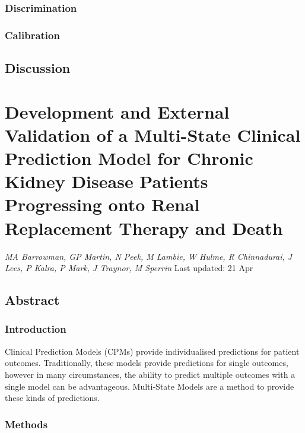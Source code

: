 \documentclass[12pt,PhD,twoside,openright]{muthesis}
\begin{document}
\hypertarget{discrimination}{%
\subsection{Discrimination}\label{discrimination}}

\hypertarget{calibration}{%
\subsection{Calibration}\label{calibration}}

\hypertarget{discussion-3}{%
\section{Discussion}\label{discussion-3}}

\hypertarget{chap-dev-paper}{%
\chapter{Development and External Validation of a Multi-State Clinical Prediction Model for Chronic Kidney Disease Patients Progressing onto Renal Replacement Therapy and Death}\label{chap-dev-paper}}

\emph{MA Barrowman, GP Martin, N Peek, M Lambie, W Hulme, R Chinnadurai, J Lees, P Kalra, P Mark, J Traynor, M Sperrin}
Last updated: 21 Apr

\hypertarget{abstract-2}{%
\section*{Abstract}\label{abstract-2}}

\hypertarget{introduction-6}{%
\subsection*{Introduction}\label{introduction-6}}

Clinical Prediction Models (CPMs) provide individualised predictions for patient outcomes. Traditionally, these models provide predictions for single outcomes, however in many circumstances, the ability to predict multiple outcomes with a single model can be advantageous. Multi-State Models are a method to provide these kinds of predictions.

\hypertarget{methods-6}{%
\subsection*{Methods}\label{methods-6}}
\end{document}

